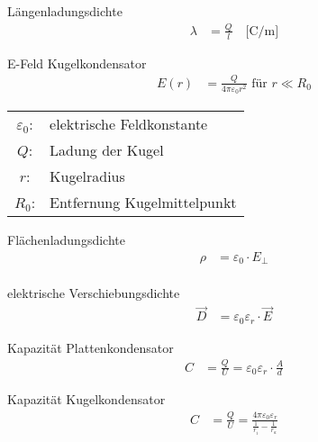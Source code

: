 \begin{karte}{Längenladungsdichte}
    \begin{align*}
        \lambda &= \frac{Q}{l} \quad \bigg[ \si{\coulomb\per\meter} \bigg]
    \end{align*}
\end{karte}

\begin{karte}{E-Feld Kugelkondensator}
    \begin{align*}
        E(r) &= \frac{Q}{4\pi \varepsilon_0 r^2} \text{ für } r \ll R_0
    \end{align*}
    \begin{tabular}[t]{cl}
        \( \varepsilon_0 \): & elektrische Feldkonstante \\
        \( Q \): & Ladung der Kugel \\
        \( r \): & Kugelradius \\
        \( R_0 \): & Entfernung Kugelmittelpunkt

    \end{tabular}
\end{karte}

\begin{karte}{Flächenladungsdichte}
    \begin{align*}
        \rho &= \varepsilon_0 \cdot E_\perp \\
    \end{align*}
\end{karte}

\begin{karte}{elektrische Verschiebungsdichte}
    \begin{align*}
        \vec D &= \varepsilon_0 \varepsilon_r \cdot \vec E
    \end{align*}
\end{karte}

\begin{karte}{Kapazität Plattenkondensator}
    \begin{align*}
        C &= \frac{Q}{U} = \varepsilon_0 \varepsilon_r \cdot \frac{A}{d}
    \end{align*}
\end{karte}

\begin{karte}{Kapazität Kugelkondensator}
    \begin{align*}
        C &= \frac{Q}{U} = \frac{ 4 \pi \varepsilon_0 \varepsilon_r }{ 
            \frac{1}{r_i} -
            \frac{1}{r_a}
        } 
    \end{align*}
\end{karte}

